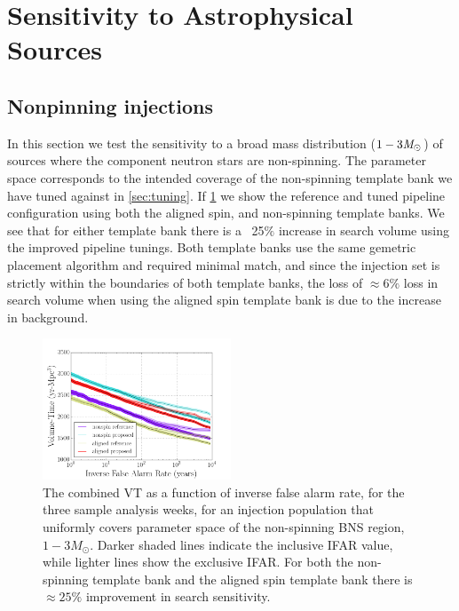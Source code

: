 
\section{Sensitivity to Astrophysical Sources}
\subsection{Nonpinning injections}

In this section we test the sensitivity to a broad mass distribution ($1-3 \mathit{M}_\odot$) of sources where the component neutron stars are non-spinning. The parameter space corresponds to the intended coverage of the non-spinning template bank we have tuned against in \ref{sec:tuning}.  If \ref{fig:nonspin} we show the reference and tuned pipeline configuration using both the aligned spin, and non-spinning template banks. We see that for either template bank there is a ~25$\%$ increase in search volume using the improved pipeline tunings. Both template banks use the same gemetric placement algorithm and required minimal match, and since the injection set is strictly within the boundaries of both template banks, the loss of $\approx 6\%$ loss in search volume when using the aligned spin template bank is due to the increase in background.

\begin{figure}
\centering
\includegraphics[width=0.5\textwidth]{papers/bns_o1_dev/figures/ns_combined.png}
\caption{\label{fig:nonspin} 
The combined VT as a function of inverse false alarm rate, for the
three sample analysis weeks, for an injection population that uniformly covers parameter space of the non-spinning BNS region, $1- 3M_\odot$. Darker shaded lines indicate the inclusive IFAR value, while lighter lines show the exclusive IFAR. For both the non-spinning template bank and the aligned spin template bank there is $\approx 25 \%$ improvement in search sensitivity.
}
\end{figure}


